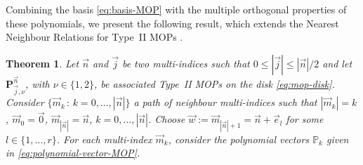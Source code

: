 \documentclass[a4paper]{article}
\theoremstyle{plain}
\newtheorem{theorem}{Theorem}
\theoremstyle{definition}
\begin{document}
    Combining the basis \eqref{eq:basis-MOP} with the multiple orthogonal properties of these polynomials, we present the following result, which extends the Nearest Neighbour Relations for Type~II MOPs \cite[Theorem 23.1.7]{Ism05}.\\

    \begin{theorem}\label{th:NNRR-2-vars}
        Let $\vec n$ and $\vec j$ be two multi-indices such that $0\leq |\vec j|\leq|\vec n|/2$ and let $\mathbf P_{\vec j,\nu}^{\vec n}$, with $\nu\in\{1,2\}$, be associated Type~II MOPs on the disk \eqref{eq:mop-disk}. Consider $\{\vec m_k \,:\, k=0,\dots,|\vec n| \}$ a path of neighbour multi-indices such that $ |\vec m_k|=k$, $\vec m_0 = \vec 0$, $\vec m_{|\vec n|}=\vec n$, $k=0,\dots,|\vec n|$. Choose $\vec w := \vec m_{|\vec n|+1}=\vec n+\vec e_l$ for some $l\in\{1,\dots,r\}$. For each multi-index $\vec m_k$, consider the polynomial vectors $\mathbb P_k$ given in \eqref{eq:polynomial-vector-MOP}.
        

\end{theorem}
\end{document}
